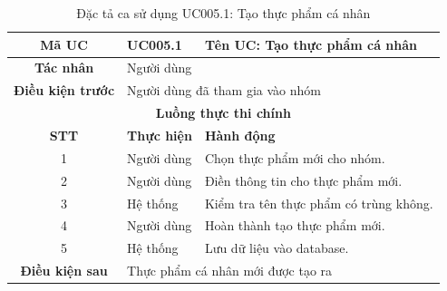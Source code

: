 \begin{table}[H]
    \centering
    \label{tab:uc005-1}
    \begin{tabularx}{\textwidth}{|c|p{3.5cm}|X|}
        \hline
        \rowcolor{headergreen} 
        \textbf{Mã UC} & \textbf{UC005.1} & \textbf{Tên UC: Tạo thực phẩm cá nhân} \\ \hline
        \textbf{Tác nhân} & \multicolumn{2}{l|}{Người dùng} \\ \hline
        \textbf{Điều kiện trước} & \multicolumn{2}{X|}{Người dùng đã tham gia vào nhóm} \\ \hline
        
        \multicolumn{3}{|c|}{\cellcolor{headerorange}\textbf{Luồng thực thi chính}} \\ \hline
        \rowcolor{graybg} \textbf{STT} & \textbf{Thực hiện} & \textbf{Hành động} \\ \hline
        1 & Người dùng & Chọn thực phẩm mới cho nhóm. \\ \hline
        2 & Người dùng & Điền thông tin cho thực phẩm mới. \\ \hline
        3 & Hệ thống & Kiểm tra tên thực phẩm có trùng không. \\ \hline
        4 & Người dùng & Hoàn thành tạo thực phẩm mới. \\ \hline
        5 & Hệ thống & Lưu dữ liệu vào database. \\ \hline
        
        \textbf{Điều kiện sau} & \multicolumn{2}{X|}{Thực phẩm cá nhân mới được tạo ra} \\ \hline
    \end{tabularx}
    \caption{Đặc tả ca sử dụng UC005.1: Tạo thực phẩm cá nhân}
\end{table}


